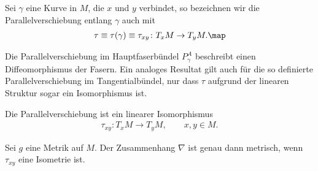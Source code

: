 \documentclass[%
	paper=a5,%
	fleqn,%
	DIV=18,%
	BCOR=0mm,
	fontsize=11pt,
	titlepage=false,%
	bibliography=totoc,
	DIV=18,%
	twoside=true,
	pdftitle=Riemannsche Geometrie,
	pdfauthor=Uwe Semmelmann,
	numbers=noendperiod]%
	{scrbook}
\begin{document}
\begin{rem}
Sei $\gamma$ eine Kurve in $M$, die $x$ und $y$ verbindet, so bezeichnen wir die
Parallelverschiebung entlang $\gamma$ auch mit
\begin{align*}
\tau \equiv \tau(\gamma) \equiv \tau_{xy} \colon T_xM\to T_yM.\map 
\end{align*}
\end{rem}

Die Parallelverschiebung im Hauptfaserbündel $P_\gamma^A$ beschreibt einen
Diffeomorphismus der Fasern. Ein analoges Resultat gilt auch für die so
definierte Parallelverschiebung im Tangentialbündel, nur dass $\tau$ aufgrund
der linearen Struktur sogar ein Isomorphismus ist.

\begin{lem}
\begin{propenum}
\item Die Parallelverschiebung ist ein linearer Isomorphismus
\begin{align*}
\tau_{xy}\colon T_xM\to T_yM,\qquad x,y\in M.
\end{align*}
\item Sei $g$ eine Metrik auf $M$. Der Zusammenhang $\nabla$ ist genau dann
metrisch, wenn $\tau_{xy}$ eine Isometrie ist.\fish
\end{propenum}
\end{lem}
\end{document}
